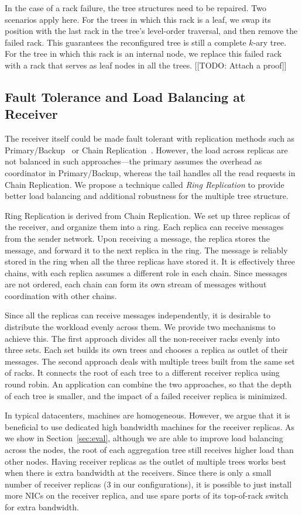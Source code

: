 In the case of a rack failure, the tree structures need to be repaired.  Two
scenarios apply here.  For the trees in which this rack is a leaf, we swap its
position with the last rack in the tree's level-order traversal, and then
remove the failed rack.  This guarantees the reconfigured tree is still a
complete $k$-ary tree.  For the tree in which this rack is an internal node,
we replace this failed rack with a rack that serves as leaf nodes in all the
trees.  [[TODO: Attach a proof]]

\subsection{Fault Tolerance and Load Balancing at Receiver}
\label{sec:design:ring}

The receiver itself could be made fault tolerant with replication methods such
as Primary/Backup~\cite{BMST93} or Chain Replication~\cite{vRS04}.  However,
the load across replicas are not balanced in such approaches---the primary
assumes the overhead as coordinator in Primary/Backup, whereas the tail handles
all the read requests in Chain Replication.  We propose a technique called
\emph{Ring Replication} to provide better load balancing and additional
robustness for the multiple tree structure. 

Ring Replication is derived from Chain Replication.  We set up three replicas
of the receiver, and organize them into a ring.  Each replica can receive
messages from the sender network.  Upon receiving a message, the replica stores
the message, and forward it to the next replica in the ring.  The message is
reliably stored in the ring when all the three replicas have stored it.  It is
effectively three chains, with each replica assumes a different role in each
chain.  Since messages are not ordered, each chain can form its own stream of
messages without coordination with other chains.

Since all the replicas can receive messages independently, it is desirable to
distribute the workload evenly across them.  We provide two mechanisms to
achieve this.  The first approach divides all the non-receiver racks evenly
into three sets.  Each set builds its own trees and chooses a replica as outlet
of their messages.  The second approach deals with multiple trees built from
the same set of racks.  It connects the root of each tree to a different receiver
replica using round robin.  An application can combine the two approaches, so
that the depth of each tree is smaller, and the impact of a failed receiver
replica is minimized.

In typical datacenters, machines are homogeneous.  However, we argue that it is
beneficial to use dedicated high bandwidth machines for the receiver replicas.
As we show in Section~\ref{sec:eval}, although we are able to improve load
balancing across the nodes, the root of each aggregation tree still receives
higher load than other nodes.  Having receiver replicas as the outlet of
multiple trees works best when there is extra bandwidth at the receivers.
Since there is only a small number of receiver replicas ($3$ in our
configurations), it is possible to just install more NICs on the receiver
replica, and use spare ports of its top-of-rack switch for extra bandwidth.


